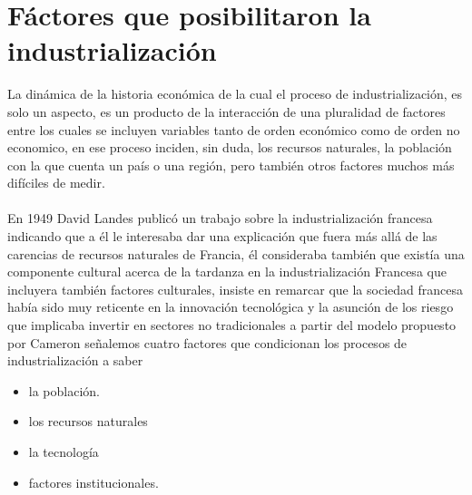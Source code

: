 \documentclass[12pt]{book}
\begin{document}
\chapter{F\'actores que posibilitaron la industrializaci\'on}

La dinámica de la historia económica de la cual el proceso de industrialización, es solo un aspecto, es un producto de la interacción de una pluralidad de factores entre los cuales se incluyen variables tanto de orden económico como de orden no economico, en ese proceso inciden, sin duda, los recursos naturales, la población con la que cuenta un país o una región, pero también otros factores muchos más difíciles de medir.
\\
\\
En 1949 David Landes publicó un trabajo sobre la industrialización francesa indicando que a él le interesaba dar una explicación que fuera más allá de las carencias de recursos naturales de Francia, él consideraba también que existía una componente cultural acerca de la tardanza en la industrialización Francesa que incluyera también factores culturales, insiste en remarcar que la sociedad francesa había sido muy reticente en la innovación tecnológica y la asunción de los riesgo que implicaba invertir en sectores no tradicionales a partir del modelo propuesto por Cameron señalemos cuatro factores que condicionan los procesos de industrialización a saber 
\begin{itemize}
\item la población.
\item los recursos naturales 
\item la tecnología 
\item factores institucionales.
\end{itemize}
\end{document}

